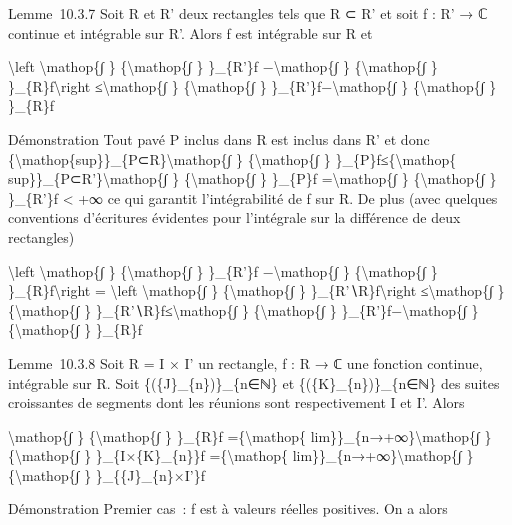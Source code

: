\documentclass[]{article}
\begin{document}
Lemme~10.3.7 Soit R et R' deux rectangles tels que R ⊂ R' et soit f : R'
→ ℂ continue et intégrable sur R'. Alors f est intégrable sur R et

\textbackslash{}left \textbar{}\textbackslash{}mathop\{∫ \}
\{\textbackslash{}mathop\{∫ \} \}\_\{R'\}f −\textbackslash{}mathop\{∫ \}
\{\textbackslash{}mathop\{∫ \} \}\_\{R\}f\textbackslash{}right
\textbar{}≤\textbackslash{}mathop\{∫ \} \{\textbackslash{}mathop\{∫ \}
\}\_\{R'\}\textbar{}f\textbar{}−\textbackslash{}mathop\{∫ \}
\{\textbackslash{}mathop\{∫ \} \}\_\{R\}\textbar{}f\textbar{}

Démonstration Tout pavé P inclus dans R est inclus dans R' et donc
\{\textbackslash{}mathop\{sup\}\}\_\{P⊂R\}\textbackslash{}mathop\{∫ \}
\{\textbackslash{}mathop\{∫ \}
\}\_\{P\}\textbar{}f\textbar{}≤\{\textbackslash{}mathop\{
sup\}\}\_\{P⊂R'\}\textbackslash{}mathop\{∫ \}
\{\textbackslash{}mathop\{∫ \} \}\_\{P\}\textbar{}f\textbar{}
=\textbackslash{}mathop\{∫ \} \{\textbackslash{}mathop\{∫ \}
\}\_\{R'\}\textbar{}f\textbar{} \textless{} +∞ ce qui garantit
l'intégrabilité de f sur R. De plus (avec quelques conventions
d'écritures évidentes pour l'intégrale sur la différence de deux
rectangles)

\textbackslash{}left \textbar{}\textbackslash{}mathop\{∫ \}
\{\textbackslash{}mathop\{∫ \} \}\_\{R'\}f −\textbackslash{}mathop\{∫ \}
\{\textbackslash{}mathop\{∫ \} \}\_\{R\}f\textbackslash{}right
\textbar{} = \textbackslash{}left \textbar{}\textbackslash{}mathop\{∫ \}
\{\textbackslash{}mathop\{∫ \} \}\_\{R'∖R\}f\textbackslash{}right
\textbar{}≤\textbackslash{}mathop\{∫ \} \{\textbackslash{}mathop\{∫ \}
\}\_\{R'∖R\}\textbar{}f\textbar{}≤\textbackslash{}mathop\{∫ \}
\{\textbackslash{}mathop\{∫ \}
\}\_\{R'\}\textbar{}f\textbar{}−\textbackslash{}mathop\{∫ \}
\{\textbackslash{}mathop\{∫ \} \}\_\{R\}\textbar{}f\textbar{}

Lemme~10.3.8 Soit R = I × I' un rectangle, f : R → ℂ une fonction
continue, intégrable sur R. Soit \{(\{J\}\_\{n\})\}\_\{n∈ℕ\} et
\{(\{K\}\_\{n\})\}\_\{n∈ℕ\} des suites croissantes de segments dont les
réunions sont respectivement I et I'. Alors

\textbackslash{}mathop\{∫ \} \{\textbackslash{}mathop\{∫ \} \}\_\{R\}f
=\{\textbackslash{}mathop\{ lim\}\}\_\{n→+∞\}\textbackslash{}mathop\{∫
\} \{\textbackslash{}mathop\{∫ \} \}\_\{I×\{K\}\_\{n\}\}f
=\{\textbackslash{}mathop\{ lim\}\}\_\{n→+∞\}\textbackslash{}mathop\{∫
\} \{\textbackslash{}mathop\{∫ \} \}\_\{\{J\}\_\{n\}×I'\}f

Démonstration Premier cas~: f est à valeurs réelles positives. On a
alors
\end{document}
